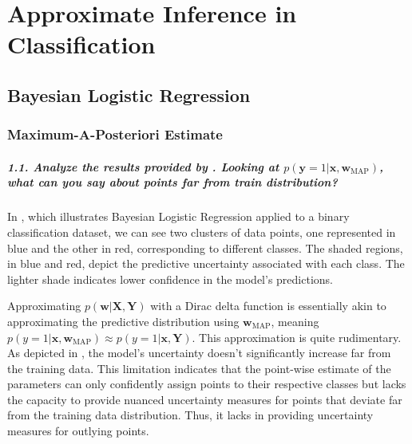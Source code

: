 \graphicspath{{figs/3b}}

\chapter{Approximate Inference in Classification}
\section{Bayesian Logistic Regression}
\subsection{Maximum-A-Posteriori Estimate}
\paragraph{1.1. Analyze the results provided by . Looking at $p(\mathbf{y}=1 | \pmb{x}, \pmb{w}_{\textrm{MAP}})$, what can you say about points far from train distribution?}
In , which illustrates Bayesian Logistic Regression applied to a binary classification dataset, we can see two clusters of data points, one represented in blue and the other in red, corresponding to different classes. The shaded regions, in blue and red, depict the predictive uncertainty associated with each class. The lighter shade indicates lower confidence in the model's predictions.

Approximating $p(\mathbf{w} | \mathbf{X}, \mathbf{Y})$ with a Dirac delta function is essentially akin to approximating the predictive distribution using $\mathbf{w}_{\textrm{MAP}}$, meaning $p(y=1 | \mathbf{x}, \mathbf{w}_{\textrm{MAP}}) \approx p(y=1 | \mathbf{x}, \mathbf{Y})$. This approximation is quite rudimentary. As depicted in , the model's uncertainty doesn't significantly increase far from the training data. This limitation indicates that the point-wise estimate of the parameters can only confidently assign points to their respective classes but lacks the capacity to provide nuanced uncertainty measures for points that deviate far from the training data distribution. Thus, it lacks in providing uncertainty measures for outlying points.


